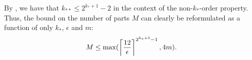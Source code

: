         \begin{remark}
            By , we have that $k_{**} \leq 2^{k_* + 1}-2$ in the context of the non-$k_*$-order
            property.
            Thus, the bound on the number of parts $M$ can clearly be reformulated as a function of only $k_*$, $\epsilon$ and $m$:
            \[
                M \leq \max ( \left\lceil \frac{12}{\epsilon} \right\rceil^{2^{k_* + 1}-1}, 4m ).
            \]
        \end{remark}




